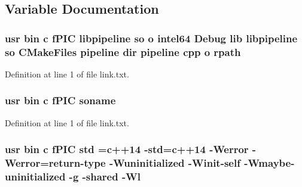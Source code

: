 \subsection{Variable Documentation}
\subsubsection[{\texorpdfstring{rpath}{rpath}}]{\setlength{\rightskip}{0pt plus 5cm}usr bin {\bf c} f\+P\+IC libpipeline {\bf so} o intel64 Debug lib libpipeline {\bf so} C\+Make\+Files pipeline dir pipeline cpp o rpath}\hypertarget{common_2pipeline_2CMakeFiles_2pipeline_8dir_2link_8txt_a854131ad1613703e932d1edc2e2cde7a}{}\label{common_2pipeline_2CMakeFiles_2pipeline_8dir_2link_8txt_a854131ad1613703e932d1edc2e2cde7a}


Definition at line 1 of file link.\+txt.

\subsubsection[{\texorpdfstring{soname}{soname}}]{\setlength{\rightskip}{0pt plus 5cm}usr bin {\bf c} f\+P\+IC soname}\hypertarget{common_2pipeline_2CMakeFiles_2pipeline_8dir_2link_8txt_ab65a9b6457c4853ed17f89f945516e66}{}\label{common_2pipeline_2CMakeFiles_2pipeline_8dir_2link_8txt_ab65a9b6457c4853ed17f89f945516e66}


Definition at line 1 of file link.\+txt.

\subsubsection[{\texorpdfstring{std}{std}}]{\setlength{\rightskip}{0pt plus 5cm}usr bin {\bf c} f\+P\+IC std ={\bf c}++14 -\/std={\bf c}++14 -\/Werror -\/Werror=return-\/type -\/Wuninitialized -\/Winit-\/self -\/Wmaybe-\/uninitialized -\/g -\/shared -\/{\bf Wl}}\hypertarget{common_2pipeline_2CMakeFiles_2pipeline_8dir_2link_8txt_a5f87c8f8e33670f7c8c5221b6be1bcc4}{}\label{common_2pipeline_2CMakeFiles_2pipeline_8dir_2link_8txt_a5f87c8f8e33670f7c8c5221b6be1bcc4}


